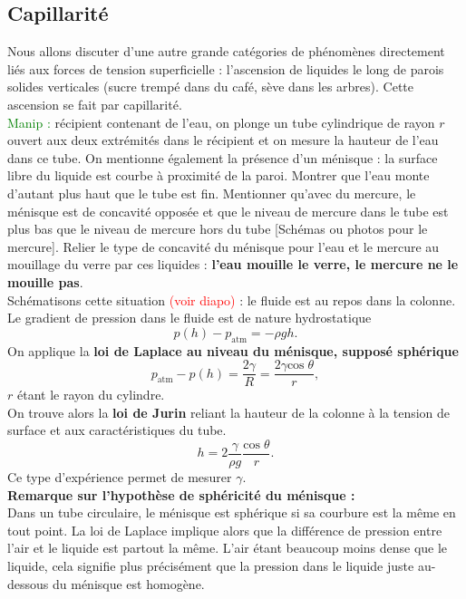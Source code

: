 \documentclass[11pt,a4paper]{report}
\begin{document}
\subsection{Capillarité}

Nous allons discuter d'une autre grande catégories de phénomènes directement liés aux forces de tension superficielle : l'ascension de liquides le long de parois solides verticales (sucre trempé dans du café, sève dans les arbres). Cette ascension se fait par capillarité.\\

\textcolor{green}{Manip :} récipient contenant de l'eau, on plonge un tube cylindrique de rayon $r$ ouvert aux deux extrémités dans le récipient et on mesure la hauteur de l'eau dans ce tube. On mentionne également la présence d'un ménisque : la surface libre du liquide est courbe à proximité de la paroi. Montrer que l'eau monte d'autant plus haut que le tube est fin. Mentionner qu'avec du mercure, le ménisque est de concavité opposée et que le niveau de mercure dans le tube est plus bas que le niveau de mercure hors du tube [Schémas ou photos pour le mercure]. Relier le type de concavité du ménisque pour l'eau et le mercure au mouillage du verre par ces liquides : \textbf{l'eau mouille le verre, le mercure ne le mouille pas}.\\

Schématisons cette situation \textcolor{red}{(voir diapo)} : le fluide est au repos dans la colonne. Le gradient de pression dans le fluide est de nature hydrostatique
\begin{equation}
	p(h) - p_\text{atm} = -\rho g h.
\end{equation} 
On applique la \textbf{loi de Laplace au niveau du ménisque, supposé sphérique}
\begin{equation}
	p_\text{atm} - p(h) = \frac{2\gamma}{R} = \frac{2\gamma \text{cos}\;\theta}{r},
\end{equation}
$r$ étant le rayon du cylindre.\\
On trouve alors la \textbf{loi de Jurin} reliant la hauteur de la colonne à la tension de surface et aux caractéristiques du tube.
\begin{equation}
	\boxed{h = 2\frac{\gamma}{\rho g} \frac{\text{cos}\;\theta}{r}}.
\end{equation}
Ce type d'expérience permet de mesurer $\gamma$.\\

\textbf{Remarque sur l'hypothèse de sphéricité du ménisque :}\\
Dans un tube circulaire, le ménisque est sphérique si sa courbure est la même en tout point. La loi de Laplace implique alors que la différence de pression entre l'air et le liquide est partout la même. L'air étant beaucoup moins dense que le liquide, cela signifie plus précisément que la pression dans le liquide juste au-dessous du ménisque est homogène.\\
\end{document}
